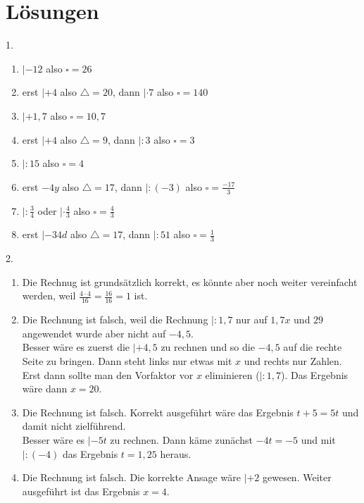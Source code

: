 \documentclass[11pt,a4paper]{scrartcl}
\begin{document}
\section*{Lösungen}
1.\vspace{-2em} %
	\begin{enumerate}[noitemsep, label=\alph*)] 
		\item $|-12$ also $\square = 26$
		\item erst $|+4$ also $\triangle = 20$, dann $|\cdot7$ also $\square = 140$
		\item $|+1,7$ also $\square = 10,7$
		\item erst $|+4$ also $\triangle = 9$, dann $|:3$ also $\square = 3$ 
		\item $|:15$ also $\square = 4$
		\item erst $-4y$ also $\triangle=17$, dann $|:(-3)$ also $\square = \frac{-17}{3}$
		\item $|:\frac{3}{4}$ oder $|\cdot\frac{4}{3}$ also $\square = \frac{4}{3}$
		\item erst $|-34d$ also $\triangle = 17$, dann $|:51$ also $\square = \frac{1}{3}$
	\end{enumerate}

2.\vspace{-2em} %
	\begin{enumerate}[label=\alph*), noitemsep] 
		\item Die Rechnug ist grundsätzlich korrekt, es könnte aber noch weiter vereinfacht werden, weil $\frac{4\cdot4}{16}=\frac{16}{16}=1$ ist.
		\item Die Rechnung ist falsch, weil die Rechnung $|:1,7$ nur auf $1,7x$ und $29$ angewendet wurde aber nicht auf $-4,5$. \\ Besser wäre es zuerst die $|+4,5$ zu rechnen und so die $-4,5$ auf die rechte Seite zu bringen. Dann steht links nur etwas mit $x$ und rechts nur Zahlen. Erst dann sollte man den Vorfaktor vor $x$ eliminieren ($|:1,7$). Das Ergebnis wäre dann $x=20$.
		\item Die Rechnung ist falsch. Korrekt ausgeführt wäre das Ergebnis $t+5 = 5t$ und damit nicht zielführend.\\
		Besser wäre es $|-5t$ zu rechnen. Dann käme zunächst $-4t = -5$ und mit $|:(-4)$ das Ergebnis $t = 1,25$ heraus.  
		\item Die Rechnung ist falsch. Die korrekte Ansage wäre $|+2$ gewesen. Weiter ausgeführt ist das Ergebnis $x=4$.
	\end{enumerate}
\end{document}
